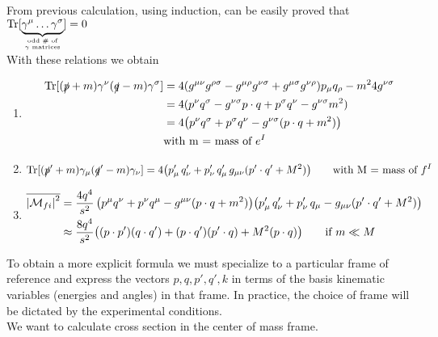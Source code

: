 \documentclass[TheoreticalPhy_ModB.tex]{subfiles}
\begin{document}
From previous calculation, using induction, can be easily proved that $\textup{Tr}[\underbrace{\gamma^{\mu} \dots \gamma^{\sigma}}_{\textup{odd \# of} \atop \gamma \textup{ matrices}}] = 0$\\
With these relations we obtain
\begin{enumerate}[label=$\bullet$]
\item
	\begin{align*}
	\textup{Tr}[(\slashed p + m) \gamma^{\nu}(\slashed q - m) \gamma^{\sigma}]
	& = 4(g^{\mu\nu}g^{\rho\sigma} - g^{\mu\rho}g^{\nu\sigma} + g^{\mu\sigma}g^{\nu\rho}) p_{\mu}q_{\rho} - m^2 4g^{\nu\sigma} \\
	& = 4 (p^{\nu}q^{\sigma} - g^{\nu\sigma}p \cdot q + p^{\sigma}q^{\nu} - g^{\nu\sigma}m^2) \\
	& = 4 \bigl(p^{\nu}q^{\sigma} + p^{\sigma}q^{\nu} - g^{\nu\sigma}(p \cdot q + m^2) \bigr) \\
	& \textup{with m = mass of }e^I
	\end{align*}
\item
	\[
	\textup{Tr} [(\slashed p' + m) \gamma_{\mu} (\slashed q' - m) \gamma_{\nu}]
		= 4 \bigl( p'_{\mu} \, q'_{\nu} + p'_{\nu}\, q'_{\mu} \, g_{\mu\nu}(p' \cdot q' + M^2) \bigr)
	\qquad \text{with M = mass of } f^I
	\]
\item
	\begin{align*}
	\overline{\left\lvert \mathcal{M}_{fi} \right\rvert^2} 
	& = \frac{4q^4}{s^2} \, \bigl( p^{\mu}q^{\nu} + p^{\nu}q^{\mu} - g^{\mu\nu}(p \cdot q + m^2) \bigr)
		\bigl( p'_{\mu}\, q'_{\nu} + p'_{\nu}\, q_{\mu} - g_{\mu\nu} (p' \cdot q' + M^2) \bigr) \\
	& \approx \frac{8q^4}{s^2} \bigl( (p \cdot p')(q \cdot q') + (p \cdot q')(p' \cdot q) + M^2(p \cdot q) \bigr)
		\qquad \textup{if } m \ll M
	\end{align*}
\end{enumerate}
To obtain a more explicit formula we must specialize to a particular frame of reference and express the vectors $p, q, p', q', k$ in terms of the basis kinematic variables (energies and angles) in that frame. In practice, the choice of frame will be dictated by the experimental conditions.\\
We want to calculate cross section in the center of mass frame.

\begin{figure}[H]
\centering

\end{figure}
\end{document}
